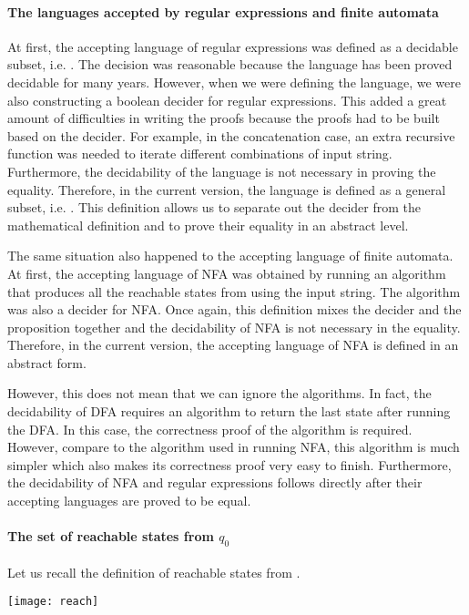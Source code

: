 \paragraph{The languages accepted by regular expressions and finite automata} At first, the
accepting language of regular expressions was defined as a decidable
subset, i.e. . The decision
was reasonable because the language has been proved decidable for many
years. However, when we were defining the language, we
were also constructing a boolean decider for regular
expressions. This added a great amount of
difficulties in writing the proofs because the proofs had to be built
based on the decider. For example, in the concatenation case, an extra recursive
function was needed to iterate different combinations of input
string. Furthermore, the decidability of the language is not
necessary in proving the equality. Therefore, in the current version, the language
is defined as a general subset, i.e. . This definition allows us to separate out the decider from
the mathematical definition and to prove their equality in an abstract level. 

\par The same situation also happened to the accepting language of finite automata. At first, the
accepting language of NFA was obtained by running an algorithm that
produces all the reachable states from \mb{q_0} using the input
string. The algorithm was also a decider for NFA. Once again, this
definition mixes the decider and the proposition together
and the decidability of NFA is not necessary in the equality. Therefore, in the current
version, the accepting language of NFA is defined in an abstract form. 

\par However, this does not mean that we can ignore the algorithms. In
fact, the decidability of DFA requires an algorithm to return the last
state after running the DFA. In this case, the correctness proof of the
algorithm is required. However, compare to the algorithm used in
running NFA, this algorithm is much simpler which also
makes its correctness proof very easy to finish. Furthermore, the
decidability of NFA and regular
expressions follows directly after their accepting languages are
proved to be equal. 

\paragraph{The set of reachable states from \(q_0\)} Let us recall the
definition of reachable states from \mb{q_0}. 
\begin{center} \texttt{[image: reach]} \end{center}

